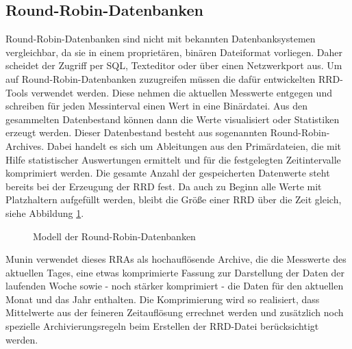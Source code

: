 \subsection{Round-Robin-Datenbanken}
Round-Robin-Datenbanken sind nicht mit bekannten Datenbanksystemen vergleichbar, da sie in einem proprietären, binären Dateiformat vorliegen.
Daher scheidet der Zugriff per SQL, Texteditor oder über einen Netzwerkport aus.
Um auf Round-Robin-Datenbanken zuzugreifen müssen die dafür entwickelten RRD-Tools verwendet werden.
Diese nehmen die aktuellen Messwerte entgegen und schreiben für jeden Messinterval einen Wert in eine Binärdatei.
Aus den gesammelten Datenbestand können dann die Werte visualisiert oder Statistiken erzeugt werden.
Dieser Datenbestand besteht aus sogenannten Round-Robin-Archives.
Dabei handelt es sich um Ableitungen aus den Primärdateien, die mit Hilfe statistischer Auswertungen ermittelt und für die festgelegten Zeitintervalle komprimiert werden.
Die gesamte Anzahl der gespeicherten Datenwerte steht bereits bei der Erzeugung der RRD fest.
Da auch zu Beginn alle Werte mit Platzhaltern aufgefüllt werden, bleibt die Größe einer RRD über die Zeit gleich, siehe Abbildung \ref{rrd-munin}.

\begin{figure}[ht]
	\centering
		\caption[Modell der Round-Robin-Datenbanken]{Modell der Round-Robin-Datenbanken\protect\footnotemark}
		\label{rrd-munin}
\end{figure}

Munin verwendet dieses RRAs als hochauflösende Archive, die die Messwerte des aktuellen Tages, eine etwas komprimierte Fassung zur Darstellung der Daten der laufenden Woche sowie - noch stärker komprimiert - die Daten für den aktuellen Monat und das Jahr enthalten.
Die Komprimierung wird so realisiert, dass Mittelwerte aus der feineren Zeitauflösung errechnet werden und zusätzlich noch spezielle Archivierungsregeln beim Erstellen der RRD-Datei berücksichtigt werden.

